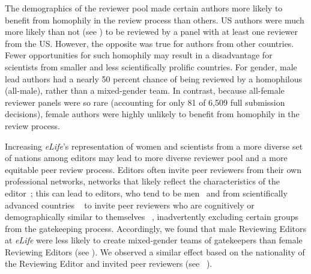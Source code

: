 \documentclass[10pt,letterpaper]{article}
\begin{document}
The demographics of the reviewer pool made certain authors more likely to benefit from homophily in the review process than others. US authors were much more likely than not (see ) to be reviewed by a panel with at least one reviewer from the US. However, the opposite was true for authors from other countries. Fewer opportunities for such homophily may result in a disadvantage for scientists from smaller and less scientifically prolific countries. For gender, male lead authors had a nearly 50 percent chance of being reviewed by a homophilous (all-male), rather than a mixed-gender team. In contrast, because all-female reviewer panels were so rare (accounting for only 81 of 6,509 full submission decisions), female authors were highly unlikely to benefit from homophily in the review process.

Increasing \textit{eLife}’s representation of women and scientists from a more diverse set of nations among editors may lead to more diverse reviewer pool and a more equitable peer review process. Editors often invite peer reviewers from their own professional networks, networks that likely reflect the characteristics of the editor~\cite{addis_editorial_2003,avin_homophily_2015, szell_how_2013}; this can lead to editors, who tend to be men~\cite{amrein_women_2011, cho_women_2014,mauleon_assessing_2013, metz_gender_2009, metz_update_2012, morton_women_2007, stegmaier_getting_2011, topaz_gender_2016, noauthor_natures_2018} and from scientifically advanced countries ~\cite{espin_persistent_2017} to invite peer reviewers who are cognitively or demographically similar to themselves ~\cite{helmer_research:_2017,lerback_journals_2017, tite_why_2007}, inadvertently excluding certain groups from the gatekeeping process. Accordingly, we found that male Reviewing Editors at \textit{eLife} were less likely to create mixed-gender teams of gatekeepers than female Reviewing Editors (see ). We observed a similar effect based on the nationality of the Reviewing Editor and invited peer reviewers (see ~).
\end{document}
